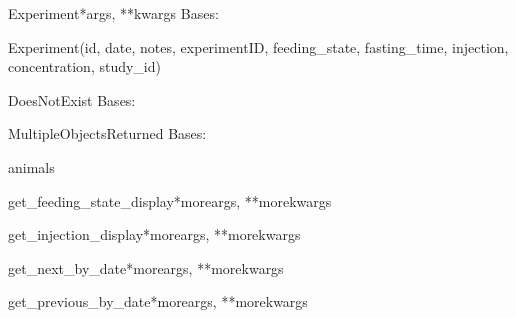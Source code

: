 \documentclass[letterpaper,10pt,english]{sphinxmanual}
\begin{document}
\hypertarget{data.models.Experiment}{}\begin{classdesc}{Experiment}{*args, **kwargs}
Bases: 

Experiment(id, date, notes, experimentID, feeding\_state, fasting\_time, injection, concentration, study\_id)

\hypertarget{data.models.Experiment.DoesNotExist}{}\begin{excdesc}{DoesNotExist}
Bases: 
\end{excdesc}

\hypertarget{data.models.Experiment.MultipleObjectsReturned}{}\begin{excdesc}{MultipleObjectsReturned}
Bases: 
\end{excdesc}

\hypertarget{data.models.Experiment.animals}{}\begin{memberdesc}[Experiment]{animals}\end{memberdesc}

\hypertarget{data.models.Experiment.get_feeding_state_display}{}\begin{methoddesc}[Experiment]{get\_feeding\_state\_display}{*moreargs, **morekwargs}\end{methoddesc}

\hypertarget{data.models.Experiment.get_injection_display}{}\begin{methoddesc}[Experiment]{get\_injection\_display}{*moreargs, **morekwargs}\end{methoddesc}

\hypertarget{data.models.Experiment.get_next_by_date}{}\begin{methoddesc}[Experiment]{get\_next\_by\_date}{*moreargs, **morekwargs}\end{methoddesc}

\hypertarget{data.models.Experiment.get_previous_by_date}{}\begin{methoddesc}[Experiment]{get\_previous\_by\_date}{*moreargs, **morekwargs}\end{methoddesc}


\end{classdesc}
\end{document}

